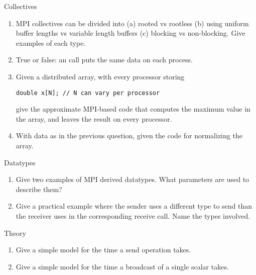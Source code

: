  {Collectives}

\begin{enumerate}

\item MPI collectives can be divided into (a) rooted vs rootless (b) using uniform
buffer lengths vs variable length buffers (c) blocking vs non-blocking. Give examples of
each type.  

\item True or false: an  call puts the same data on
  each process.

\item Given a distributed array, with every processor storing
\begin{verbatim}
double x[N]; // N can vary per processor
\end{verbatim}
give the approximate MPI-based code that computes the maximum value
in the array, and leaves the result on every processor.

\item With data as in the previous question, given the code for
normalizing the array.
\end{enumerate}

 {Datatypes}

\begin{enumerate}
\item Give two examples of MPI derived datatypes. What parameters are used
to describe them?

\item Give a practical example where the sender uses a different type to send
  than the receiver uses in the corresponding receive call. Name the types involved.

\end{enumerate}

 {Theory}

\begin{enumerate}

\item Give a simple model for the time a send operation takes.

\item Give a simple model for the time a broadcast of a single scalar takes.


\end{enumerate}

